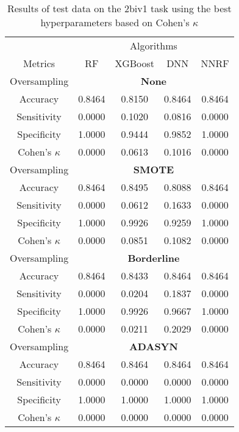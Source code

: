 \begin{table}[!htb]
\centering
\caption{Results of test data on the 2biv1 task using the best hyperparameters based on Cohen's $\kappa$}
\label{tab:2biv1_test_results}
\begin{tabular}{c | c c c c}
\hline
 & \multicolumn{4}{c}{Algorithms}\\ 
Metrics &RF & XGBoost & DNN & NNRF\\ 
\hline
Oversampling &\multicolumn{4}{|c}{\textbf{None}}\\ 
\hline
Accuracy & 0.8464 & 0.8150 & 0.8464 & 0.8464\\ 
Sensitivity & 0.0000 & 0.1020 & 0.0816 & 0.0000\\ 
Specificity & 1.0000 & 0.9444 & 0.9852 & 1.0000\\ 
Cohen's $\kappa$ & 0.0000 & 0.0613 & 0.1016 & 0.0000\\ 
\hline
Oversampling &\multicolumn{4}{|c}{\textbf{SMOTE}}\\ 
\hline
Accuracy & 0.8464 & 0.8495 & 0.8088 & 0.8464\\ 
Sensitivity & 0.0000 & 0.0612 & 0.1633 & 0.0000\\ 
Specificity & 1.0000 & 0.9926 & 0.9259 & 1.0000\\ 
Cohen's $\kappa$ & 0.0000 & 0.0851 & 0.1082 & 0.0000\\ 
\hline
Oversampling &\multicolumn{4}{|c}{\textbf{Borderline}}\\ 
\hline
Accuracy & 0.8464 & 0.8433 & 0.8464 & 0.8464\\ 
Sensitivity & 0.0000 & 0.0204 & 0.1837 & 0.0000\\ 
Specificity & 1.0000 & 0.9926 & 0.9667 & 1.0000\\ 
Cohen's $\kappa$ & 0.0000 & 0.0211 & 0.2029 & 0.0000\\ 
\hline
Oversampling &\multicolumn{4}{|c}{\textbf{ADASYN}}\\ 
\hline
Accuracy & 0.8464 & 0.8464 & 0.8464 & 0.8464\\ 
Sensitivity & 0.0000 & 0.0000 & 0.0000 & 0.0000\\ 
Specificity & 1.0000 & 1.0000 & 1.0000 & 1.0000\\ 
Cohen's $\kappa$ & 0.0000 & 0.0000 & 0.0000 & 0.0000\\ 
\hline
\end{tabular}
\end{table}


